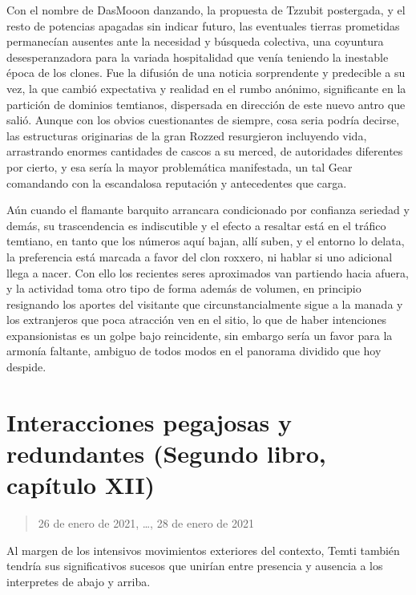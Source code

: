 \documentclass[
]{book}
\begin{document}
Con el nombre de DasMooon danzando, la propuesta de Tzzubit postergada, y el resto de potencias apagadas sin indicar futuro, las eventuales tierras prometidas permanecían ausentes ante la necesidad y búsqueda colectiva, una coyuntura desesperanzadora para la variada hospitalidad que venía teniendo la inestable época de los clones. Fue la difusión de una noticia sorprendente y predecible a su vez, la que cambió expectativa y realidad en el rumbo anónimo, significante en la partición de dominios temtianos, dispersada en dirección de este nuevo antro que salió. Aunque con los obvios cuestionantes de siempre, cosa seria podría decirse, las estructuras originarias de la gran Rozzed resurgieron incluyendo vida, arrastrando enormes cantidades de cascos a su merced, de autoridades diferentes por cierto, y esa sería la mayor problemática manifestada, un tal Gear comandando con la escandalosa reputación y antecedentes que carga.

Aún cuando el flamante barquito arrancara condicionado por confianza seriedad y demás, su trascendencia es indiscutible y el efecto a resaltar está en el tráfico temtiano, en tanto que los números aquí bajan, allí suben, y el entorno lo delata, la preferencia está marcada a favor del clon roxxero, ni hablar si uno adicional llega a nacer. Con ello los recientes seres aproximados van partiendo hacia afuera, y la actividad toma otro tipo de forma además de volumen, en principio resignando los aportes del visitante que circunstancialmente sigue a la manada y los extranjeros que poca atracción ven en el sitio, lo que de haber intenciones expansionistas es un golpe bajo reincidente, sin embargo sería un favor para la armonía faltante, ambiguo de todos modos en el panorama dividido que hoy despide.

\hypertarget{interacciones-pegajosas-y-redundantes-segundo-libro-capuxedtulo-xii}{%
\section{Interacciones pegajosas y redundantes (Segundo libro, capítulo XII)}\label{interacciones-pegajosas-y-redundantes-segundo-libro-capuxedtulo-xii}}

\begin{quote}
26 de enero de 2021, \ldots, 28 de enero de 2021
\end{quote}

Al margen de los intensivos movimientos exteriores del contexto, Temti también tendría sus significativos sucesos que unirían entre presencia y ausencia a los interpretes de abajo y arriba.
\end{document}
